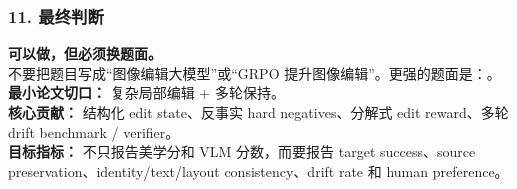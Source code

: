 \subsubsection*{11. 最终判断}

\begin{conceptbox}
\textbf{可以做，但必须换题面。}\\
不要把题目写成“图像编辑大模型”或“GRPO 提升图像编辑”。更强的题面是：。\\
\textbf{最小论文切口：} 复杂局部编辑 + 多轮保持。\\
\textbf{核心贡献：} 结构化 edit state、反事实 hard negatives、分解式 edit reward、多轮 drift benchmark / verifier。\\
\textbf{目标指标：} 不只报告美学分和 VLM 分数，而要报告 target success、source preservation、identity/text/layout consistency、drift rate 和 human preference。
\end{conceptbox}

